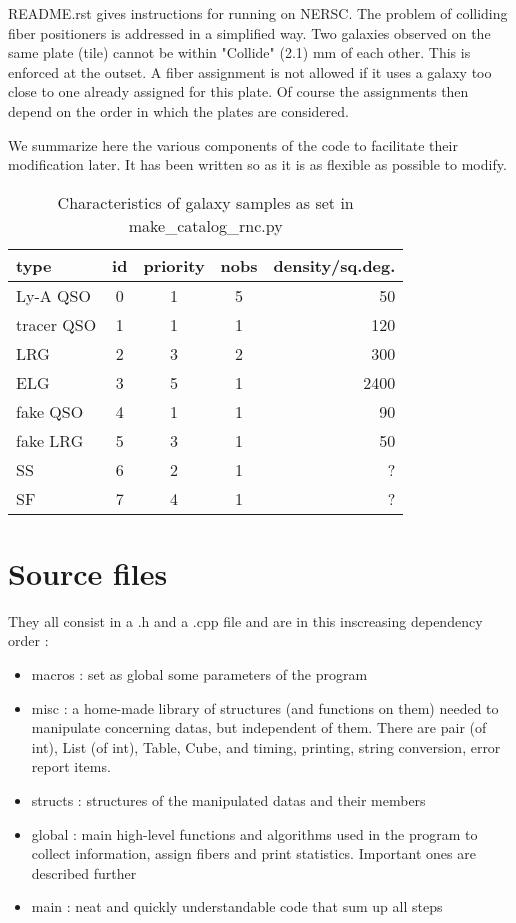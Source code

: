 \documentclass{article}
\begin{document}
  
  README.rst gives instructions for running on NERSC.  The problem of colliding fiber positioners is addressed in a simplified way.  Two galaxies observed on the same plate (tile) cannot be within "Collide" (2.1) mm of each other.  This is enforced at the outset. A fiber assignment is not allowed if it uses a galaxy too close to one already assigned for this plate.  Of course the assignments then depend on the order in which the plates are considered.  
  
  We summarize here the various components of the code to facilitate their modification later. It has been written so as it is as flexible as possible to modify.

  \begin{table}\begin{center}
  \caption{Characteristics of galaxy samples as set in make\_catalog\_rnc.py}\label{tab:characteristics}
  \begin{tabular}{lcccr}\\ \hline
  type&id&priority&nobs&density/sq.deg.\\ \hline
  Ly-A QSO & 0 & 1 & 5 &  50\\
  tracer QSO & 1 & 1 & 1& 120\\
  LRG & 2 & 3 &2 & 300\\
  ELG & 3 & 5 & 1 & 2400\\
  fake QSO & 4 & 1 & 1& 90\\
  fake LRG & 5 & 3 & 1 & 50\\
  SS & 6 & 2 & 1&  ?\\
  SF & 7 & 4 & 1& ?\\ \hline
    \end{tabular}\end{center}
  \end{table}


 \section{Source files}
 They all consist in a .h and a .cpp file and are in this inscreasing dependency order :
       \begin{itemize} 
	       \item macros : set as global some parameters of the program
	       \item misc : a home-made library of structures (and functions on them) needed to manipulate concerning datas, but independent of them. There are pair (of int), List (of int), Table, Cube, and timing, printing, string conversion, error report items.
	       \item structs : structures of the manipulated datas and their members
	       \item global : main high-level functions and algorithms used in the program to collect information, assign fibers and print statistics. Important ones are described further
	       \item main : neat and quickly understandable code that sum up all steps
       \end{itemize} 
  
\end{document}
